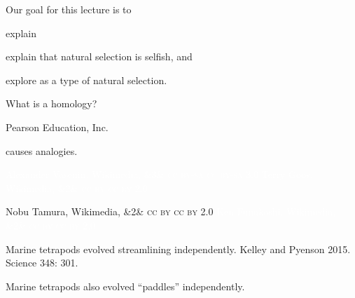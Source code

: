 \documentclass[t]{beamer}
\newcommand{\ccby}[1]{%
	\ifx&#1&
	{\textsc{cc by}}%
\else
	{\textsc{cc by #1.0}}
\fi}
\newcommand{\ccbysa}[1]{%
	\ifx&#1&
	{\textsc{cc by-sa}}%
\else
	{\textsc{cc by-sa #1.0}} 
\fi}
\begin{document}
\begin{frame}{Our goal for this lecture is to }
	
	\hangpara explain 

	\hangpara explain that natural selection is selfish, and
	
	
	\hangpara explore  as a type of natural selection.

\end{frame}
%

{
\begin{frame}[t]{What is a homology?}

\vfilll

\hfill \tiny \textcopyright Pearson Education, Inc.
\end{frame}
}

{
\begin{frame}[t]{ causes analogies.}

\vspace{3.85cm}

\tiny \textcolor{white}{Alexander Vasenin, Wikimedia, \ccbysa{3}}
\hfill
\tiny \textcolor{white}{Terry Goos, Wikimedia, \ccby{2}}

\vfilll

\tiny Nobu Tamura, Wikimedia, \ccby{2}
\hfill
\tiny \textcolor{white}{Ken Funakoshi, Wikimedia, \ccby{2}}

\end{frame}
}

{
\begin{frame}[b]{Marine tetrapods evolved streamlining independently.}
\hfill \tiny Kelley and Pyenson 2015. Science 348: 301.
\end{frame}
}

{
\begin{frame}[b]{Marine tetrapods also evolved “paddles” independently.}
\hfill {}
\end{frame}
}
\end{document}

